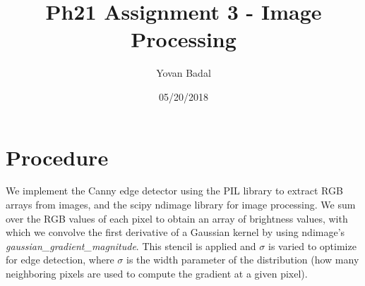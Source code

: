 \documentclass[11pt]{article}
\begin{document}
	\title{Ph21 Assignment 3 - Image Processing}
	\author{Yovan Badal}
	\date{05/20/2018}
	\maketitle
	
\section{Procedure}
We implement the Canny edge detector using the PIL library to extract RGB arrays from images, and the scipy ndimage library for image processing. We sum over the RGB values of each pixel to obtain an array of brightness values, with which we convolve the first derivative of a Gaussian kernel by using ndimage's \textit{gaussian\_gradient\_magnitude}. This stencil is applied and $\sigma$ is varied to optimize for edge detection, where $\sigma$ is the width parameter of the distribution (how many neighboring pixels are used to compute the gradient at a given pixel).
\end{document}
